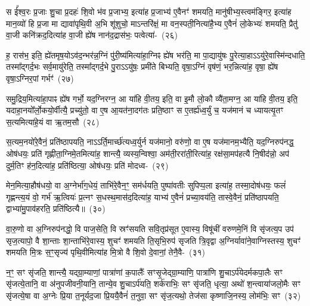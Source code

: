 स ई᳚श्व॒रः प्र॒जाः शु॒चा प्र॒दहः॑ शि॒वो भ॑व प्र॒जाभ्य॒ इत्या॑ह प्र॒जाभ्य॑ ए॒वैनꣳ॑ शमयति॒ मानु॑षीभ्य॒स्त्वम॑ङ्गिर॒ इत्या॑ह मान॒व्यो॑ हि प्र॒जा मा द्यावा॑\-पृथि॒वी अ॒भि शू॑शुचो॒ माऽन्तरि॑क्षं॒ मा वन॒स्पती॒नित्या॑है॒भ्य ए॒वैनं॑ लो॒केभ्यः॑ शमयति॒ प्रैतु॑ वा॒जी कनि॑क्रद॒दित्या॑ह वा॒जी ह्ये॑ष नान॑द॒द्रास॑भः॒ पत्वेत्या॑-~(२६)\ip

ह॒ रास॑भ॒ इति॒ ह्ये॑तमृष॒यो\-ऽव॑द॒न्भर॑न्न॒ग्निं पु॑री॒ष्य॑मित्या॑हा॒ग्निꣴ ह्ये॑ष भर॑ति॒ मा पा॒द्यायु॑षः पु॒रेत्या॒हा\-ऽऽ\-यु॑रे॒वास्मि॑न्दधाति॒ तस्मा᳚द्\-गर्द॒भः सर्व॒मायु॑रेति॒ तस्मा᳚द्\-गर्द॒भे पु॒रा\-ऽऽ\-यु॑षः॒ प्रमी॑ते बिभ्यति॒ वृषा॒\-ऽ\-ग्निं वृष॑णं॒ भर॒न्नित्या॑ह॒ वृषा॒ ह्ये॑ष वृषा॒\-ऽ\-ग्निर॒पां गर्भꣳ॑~(२७)\ip

समु॒द्रिय॒मित्या॑हा॒पाꣴ ह्ये॑ष गर्भो॒ यद॒ग्निरग्न॒ आ या॑हि वी॒तय॒ इति॒ वा इ॒मौ लो॒कौ व्यै॑ता॒मग्न॒ आ या॑हि वी॒तय॒ इति॒ यदाहा॒नयो᳚र्लो॒कयो॒र्वीत्यै॒ प्रच्यु॑तो॒ वा ए॒ष आ॒यत॑ना॒दग॑तः प्रति॒ष्ठाꣳ स ए॒तर्\mbox{}ह्य॑ध्व॒र्युं च॒ यज॑मानं च ध्यायत्यृ॒तꣳ स॒त्यमित्या॑हे॒यं वा ऋ॒तम॒सौ~(२८)\ip

स॒त्यम॒नयो॑रे॒वैनं॒ प्रति॑\-ष्ठापयति॒ नाऽऽर्ति॒मार्च्छ॑त्यध्व॒र्युर्न यज॑मानो॒ वरु॑णो॒ वा ए॒ष यज॑मानम॒भ्यैति॒ यद॒ग्निरुप॑नद्ध॒ ओष॑धयः॒ प्रति॑ गृह्णीता॒ग्निमे॒तमित्या॑ह॒ शान्त्यै॒ व्यस्य॒न्विश्वा॒ अम॑ती॒ररा॑ती॒रित्या॑ह॒ रक्ष॑सा॒मप॑हत्यै नि॒षीद॑न्नो॒ अप॑ दुर्म॒तिꣳ ह॑न॒दित्या॑ह॒ प्रति॑ष्ठित्या॒ ओष॑धयः॒ प्रति॑ मोदध्व-~(२९)\ip

मेन॒मित्या॒हौष॑धयो॒ वा अ॒ग्नेर्भा॑ग॒धेयं॒ ताभि॑रे॒वैन॒ꣳ॒ सम॑र्धयति॒ पुष्पा॑वतीः सुपिप्प॒ला इत्या॑ह॒ तस्मा॒दोष॑धयः॒ फलं॑ गृह्णन्त्य॒यं वो॒ गर्भ॑ ऋ॒त्वियः॑ प्र॒त्नꣳ स॒धस्थ॒मास॑द॒दित्या॑ह॒ याभ्य॑ ए॒वैनं॑ प्रच्या॒वय॑ति॒ तास्वे॒वैनं॒ प्रति॑\-ष्ठापयति॒ द्वाभ्या॑मु॒पाव॑हरति॒ प्रति॑ष्ठित्यै॥~(३०)\ip

{\anuvakamend[{अ॒स्त्व॒नु॒ष्टुब॑सि सादय॒त्यारू॑ढः॒ पत्वेति॒ गर्भ॑म॒सौ मो॑दध्वं॒ द्विच॑त्वारिꣳशच्च}]}

वा॒रु॒णो वा अ॒ग्निरुप॑नद्धो॒ वि पाज॒सेति॒ वि स्रꣳ॑सयति सवि॒तृप्र॑सूत ए॒वास्य॒ विषू॑चीं वरुणमे॒निं वि सृ॑जत्य॒प उप॑ सृज॒त्यापो॒ वै शा॒न्ताः शा॒न्ताभि॑रे॒वास्य॒ शुचꣳ॑ शमयति ति॒सृभि॒रुप॑ सृजति त्रि॒वृद्वा अ॒ग्निर्यावा॑ने॒वाग्निस्तस्य॒ शुचꣳ॑ शमयति मि॒त्रः स॒ꣳ॒सृज्य॑ पृथि॒वीमित्या॑ह मि॒त्रो वै शि॒वो दे॒वानां॒ तेनै॒वै-~(३१)\ip

न॒ꣳ॒ सꣳ सृ॑जति॒ शान्त्यै॒ यद्ग्रा॒म्याणां॒ पात्रा॑णां क॒पालैः᳚ सꣳसृ॒जेद्ग्रा॒म्याणि॒ पात्रा॑णि शु॒चा\-ऽर्प॑येदर्मकपा॒लैः सꣳ सृ॑जत्ये॒तानि॒ वा अ॑नुपजीवनी॒यानि॒ तान्ये॒व शु॒चा\-ऽर्प॑यति॒ शर्क॑राभिः॒ सꣳ सृ॑जति॒ धृत्या॒ अथो॑ श॒न्त्वाया॑जलो॒मैः सꣳ सृ॑जत्ये॒षा वा अ॒ग्नेः प्रि॒या त॒नूर्यद॒जा प्रि॒ययै॒वैनं॑ त॒नुवा॒ सꣳ सृ॑ज॒त्यथो॒ तेज॑सा कृष्णाजि॒नस्य॒ लोम॑भिः॒ सꣳ~(३२)\ip

